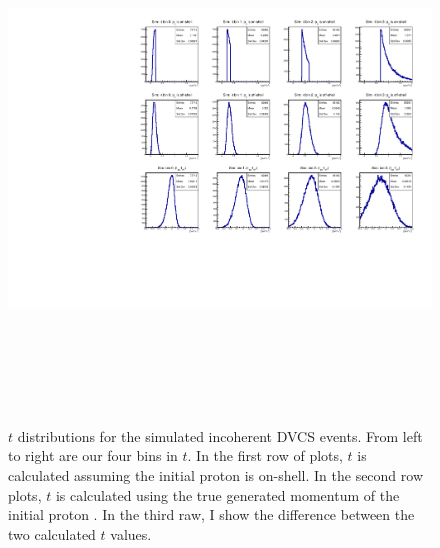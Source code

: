 \documentclass[a4paper,11pt,twoside]{article}
\begin{document}
\begin{figure}[h!]
   \centering
\includegraphics[height=14.0cm]{figs/sim_t_n_Incoh.pdf}
\caption{$t$ distributions for the simulated incoherent DVCS events. From left 
   to right are our four bins in $t$. In the first row of plots, $t$ is 
   calculated assuming the initial proton is on-shell. In the second row plots, 
   $t$ is calculated using the true generated momentum of the initial proton .  
   In the third raw, I show the difference between the two calculated $t$ 
   values.}
   \label{fig:sim}
\end{figure}
\end{document}
